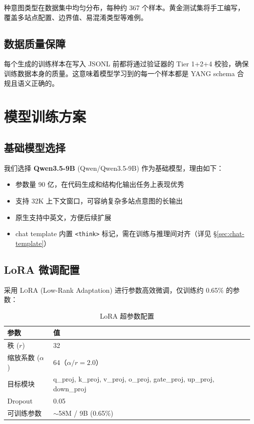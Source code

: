 \documentclass[12pt, a4paper]{article}
\newcommand{\yang}{\textsc{YANG}}
\newcommand{\lora}{\textsc{LoRA}}
\begin{document}
 种意图类型在数据集中均匀分布，每种约 367 个样本。黄金测试集将手工编写，覆盖多站点配置、边界值、易混淆类型等难例。

\subsection{数据质量保障}

每个生成的训练样本在写入 JSONL 前都将通过验证器的 Tier 1+2+4 校验，确保训练数据本身的质量。这意味着模型学习到的每一个样本都是 \yang{} schema 合规且语义正确的。

\section{模型训练方案}
\label{sec:training}

\subsection{基础模型选择}

我们选择 \textbf{Qwen3.5-9B} (Qwen/Qwen3.5-9B) 作为基础模型，理由如下：

\begin{itemize}
  \item 参数量 90 亿，在代码生成和结构化输出任务上表现优秀
  \item 支持 32K 上下文窗口，可容纳复杂多站点意图的长输出
  \item 原生支持中英文，方便后续扩展
  \item chat template 内置 \texttt{<think>} 标记，需在训练与推理间对齐（详见 \S\ref{sec:chat-template}）
\end{itemize}

\subsection{LoRA 微调配置}

采用 \lora{} (Low-Rank Adaptation) 进行参数高效微调，仅训练约 0.65\% 的参数：

\begin{table}[H]
\centering
\caption{LoRA 超参数配置}
\label{tab:lora-config}
\small
\begin{tabular}{ll}
\toprule
\textbf{参数} & \textbf{值} \\
\midrule
秩 ($r$)                & 32 \\
缩放系数 ($\alpha$)     & 64（$\alpha/r = 2.0$）\\
目标模块               & q\_proj, k\_proj, v\_proj, o\_proj, gate\_proj, up\_proj, down\_proj \\
Dropout                & 0.05 \\
可训练参数             & $\sim$58M / 9B (0.65\%) \\
\bottomrule
\end{tabular}
\end{table}
\end{document}
